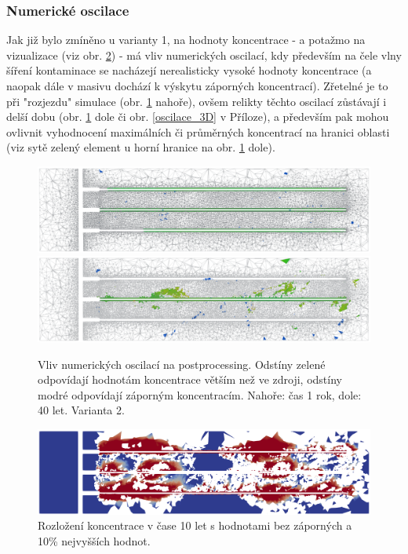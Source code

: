 \documentclass[11pt,a4paper]{article}
\newcommand{\obraz}[1]{(viz obr. \ref{#1})}
\begin{document}
\begin{onehalfspacing}
\newpage
\subsubsection{Numerické oscilace}
Jak již bylo zmíněno u varianty 1, na hodnoty koncentrace - a potažmo na vizualizace \obraz{threshold0-500} - má vliv numerických oscilací, kdy především na čele vlny šíření kontaminace se nacházejí nerealisticky vysoké hodnoty koncentrace (a naopak dále v masivu dochází k výskytu záporných koncentrací). Zřetelné je to při "rozjezdu" simulace (obr. \ref{oscilace_slice} nahoře), ovšem relikty těchto oscilací zůstávají i delší dobu (obr. \ref{oscilace_slice} dole  či obr. \ref{oscilace_3D} v Příloze), a především pak mohou ovlivnit vyhodnocení maximálních či průměrných koncentrací na hranici oblasti (viz sytě zelený element u horní hranice na obr. \ref{oscilace_slice} dole).

\begin{figure}[H]
\centering
\includegraphics[width=16cm]{graphics/obr_ralek/var2/oscilace/slice01a.png}
\includegraphics[width=16cm]{graphics/obr_ralek/var2/oscilace/slice40a.png}
\caption{Vliv numerických oscilací na postprocessing. Odstíny zelené odpovídají hodnotám koncentrace větším než ve zdroji, odstíny modré odpovídají záporným koncentracím. Nahoře: čas 1 rok, dole: 40 let. Varianta 2.}
\label{oscilace_slice}
\end{figure}

\begin{figure}[H]
\centering
\includegraphics[width=16cm]{graphics/obr_ralek/var2/threshold0-500.png}
\caption{Rozložení koncentrace v čase 10 let s hodnotami bez záporných a 10\% nejvyšších hodnot.}
\label{threshold0-500}
\end{figure}


\end{onehalfspacing}
\end{document}
